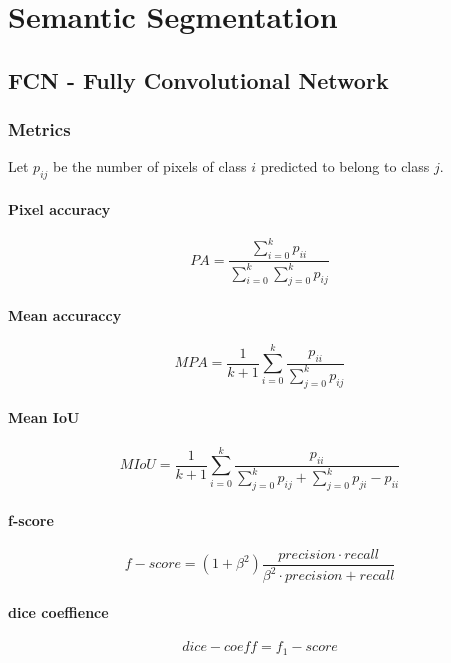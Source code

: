 \chapter{Semantic Segmentation}

\section{FCN - Fully Convolutional Network}

\subsection{Metrics}
Let $p_{ij}$ be the number of pixels of class $i$ predicted to belong to class $j$.

\subsubsection{Pixel accuracy}

\[
    PA = \frac{\sum\limits_{i=0}^k p_{ii}}{\sum\limits_{i=0}^k \sum\limits_{j=0}^k p_{ij}}
\]

\subsubsection{Mean accuraccy}

\[
    MPA = \frac{1}{k + 1} \sum\limits_{i=0}^k \frac{p_{ii}}{\sum\limits_{j=0}^k p_{ij}}
\]

\subsubsection{Mean IoU}

\[
    MIoU = \frac{1}{k + 1} \sum_{i=0}^k \frac{p_{ii}}{\sum\limits_{j=0}^k p_{ij} + \sum\limits_{j=0}^k p_{ji} - p_{ii}}
\]

\subsubsection{f-score}

\[
    f-score = (1 + \beta ^2) \frac{precision \cdot recall}{\beta^2 \cdot precision + recall}
\]

\subsubsection{dice coeffience}
\[
    dice-coeff = f_{1}-score
\]